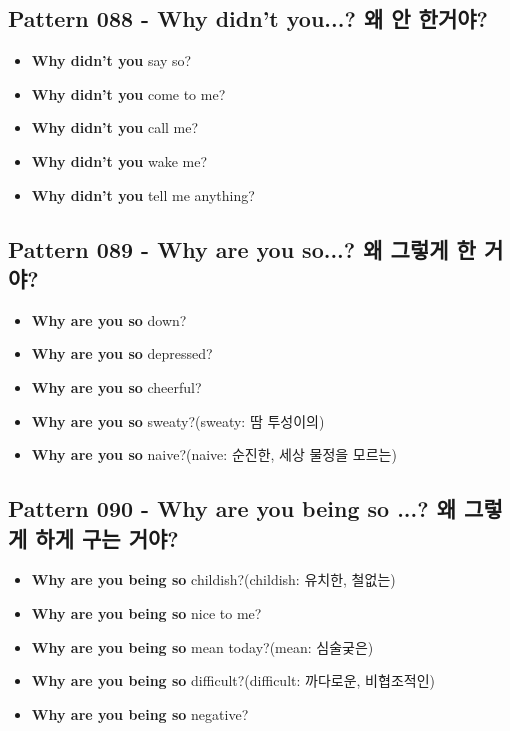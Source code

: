 \documentclass[11pt]{oblivoir}
\begin{document}
\subsection{Pattern 088 - Why didn't you...? 왜 \texttildelow 안 한거야?}
\begin{itemize}
  \item \textbf{Why didn't you} say so?
  \item \textbf{Why didn't you} come to me?
  \item \textbf{Why didn't you} call me?
  \item \textbf{Why didn't you} wake me?
  \item \textbf{Why didn't you} tell me anything?
\end{itemize}

\subsection{Pattern 089 - Why are you so...? 왜 그렇게 \texttildelow 한 거야?}
\begin{itemize}
  \item \textbf{Why are you so} down?
  \item \textbf{Why are you so} depressed?
  \item \textbf{Why are you so} cheerful?
  \item \textbf{Why are you so} sweaty?(sweaty: 땀 투성이의)
  \item \textbf{Why are you so} naive?(naive: 순진한, 세상 물정을 모르는)
\end{itemize}

\subsection{Pattern 090 - Why are you being so ...? 왜 그렇게 \texttildelow 하게 구는 거야?}
\begin{itemize}
  \item \textbf{Why are you being so} childish?(childish: 유치한, 철없는)
  \item \textbf{Why are you being so} nice to me?
  \item \textbf{Why are you being so} mean today?(mean: 심술궂은)
  \item \textbf{Why are you being so} difficult?(difficult: 까다로운, 비협조적인)
  \item \textbf{Why are you being so} negative?
\end{itemize}
\end{document}
